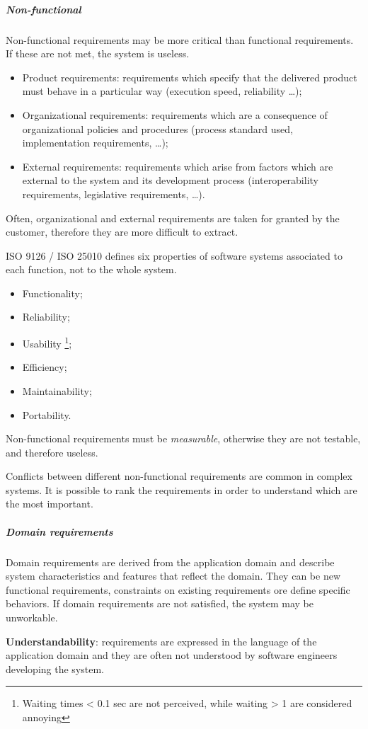 \subparagraph{Non-functional}
Non-functional requirements may be more critical than functional requirements. If these are not met, the system is useless.
\begin{itemize}
\item Product requirements: requirements which specify that the delivered product must behave in a particular way (execution speed, reliability \dots);
\item Organizational requirements: requirements which are a consequence of organizational policies and procedures (process standard used, implementation requirements, \dots);
\item External requirements: requirements which arise from factors which are external to the system and its development process (interoperability requirements, legislative requirements, \dots).
\end{itemize}
Often, organizational and external requirements are taken for granted by the customer, therefore they are more difficult to extract.

ISO 9126 / ISO 25010 defines six properties of software systems associated to each function, not to the whole system.
\begin{itemize}
\item Functionality;
\item Reliability;
\item Usability \footnote{Waiting times < 0.1 sec are not perceived, while waiting > 1 are considered annoying};
\item Efficiency;
\item Maintainability;
\item Portability.
\end{itemize}

Non-functional requirements must be \emph{measurable}, otherwise they are not testable, and therefore useless.

Conflicts between different non-functional requirements are common in complex systems. It is possible to rank the requirements in order to understand which are the most important.

\subparagraph{Domain requirements}
Domain requirements are derived from the application domain and describe system characteristics and features that reflect the domain. They can be new functional requirements, constraints on existing requirements ore define specific behaviors. If domain requirements are not satisfied, the system may be unworkable.

\textbf{Understandability}: requirements are expressed in the language of the application domain and they are often not understood by software engineers developing the system.

